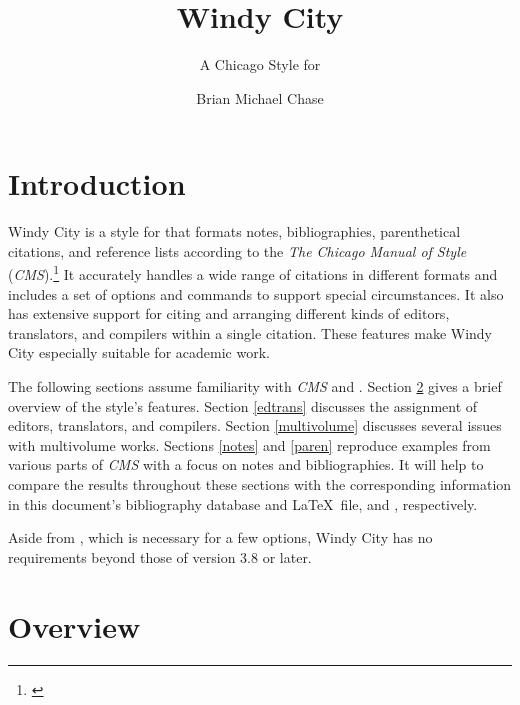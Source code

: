 \documentclass[11pt,letterpaper,oneside]{article}
\begin{document}
\title{Windy City}
\subtitle{A Chicago Style for \biblatex}
\author{Brian Michael Chase}
\maketitle
\tableofcontents{}

\section{Introduction}


Windy City is a style for \biblatex that formats notes,
bibliographies, parenthetical citations, and reference lists according
to the \textit{The Chicago Manual of Style}
(\textit{CMS}).\footnote{\cite{chicago2017}} It accurately handles a
wide range of citations in different formats and includes a set of
options and commands to support special circumstances. It also has
extensive support for citing and arranging different kinds of editors,
translators, and compilers within a single citation. These features
make Windy City especially suitable for academic work.

The following sections assume familiarity with \textit{CMS} and
\biblatex. Section \ref{overview} gives a brief overview of the
style's features. Section \ref{edtrans} discusses the assignment of
editors, translators, and compilers. Section \ref{multivolume}
discusses several issues with multivolume works. Sections \ref{notes}
and \ref{paren} reproduce examples from various parts of \textit{CMS}
with a focus on notes and bibliographies. It will help to compare the
results throughout these sections with the corresponding information
in this document's bibliography database and \LaTeX\ file,
 and , respectively.

Aside from \biber, which is necessary for a few options, Windy City
has no requirements beyond those of \biblatex version 3.8 or later.

\section{Overview}
\label{overview}
\end{document}
